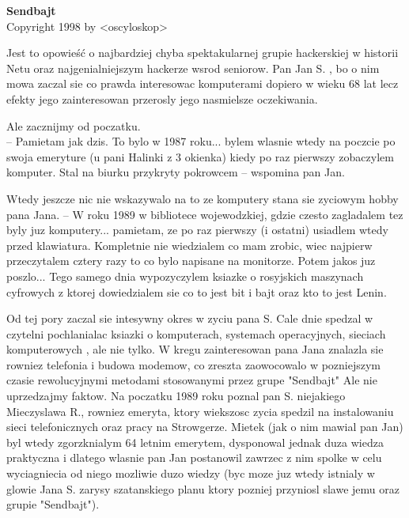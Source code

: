 \documentclass[a4paper,polish,titlepage,12pt]{article}
\begin{document}
\begin{titlepage}
\begin{center}
{\Huge\bf Sendbajt}\\
\vspace{2cm}
{\small Copyright 1998 by <oscyloskop>}
\end{center}
\end{titlepage}

Jest to opowieść o najbardziej chyba spektakularnej grupie hackerskiej w historii Netu oraz najgenialniejszym hackerze wsrod seniorow. Pan Jan S. , bo o nim mowa zaczal sie co prawda interesowac komputerami dopiero w wieku 68 lat lecz efekty jego zainteresowan przerosly jego nasmielsze oczekiwania.

Ale zacznijmy od poczatku.\\
-- Pamietam jak dzis. To bylo w 1987 roku... bylem wlasnie wtedy na poczcie po swoja emeryture (u pani Halinki z 3 okienka) kiedy po raz pierwszy zobaczylem komputer. Stal na biurku przykryty pokrowcem -- wspomina pan Jan.

Wtedy jeszcze nic nie wskazywalo na to ze komputery stana sie zyciowym hobby pana Jana.
-- W roku 1989 w bibliotece wojewodzkiej, gdzie czesto zagladalem tez byly juz komputery... pamietam, ze po raz pierwszy (i ostatni) usiadlem wtedy przed klawiatura. Kompletnie nie wiedzialem co mam zrobic, wiec najpierw przeczytalem cztery razy to co bylo napisane na monitorze. Potem jakos juz poszlo... Tego samego dnia wypozyczylem ksiazke o rosyjskich maszynach cyfrowych z ktorej dowiedzialem sie co to jest bit i bajt oraz kto to jest Lenin.

Od tej pory zaczal sie intesywny okres w zyciu pana S. Cale dnie spedzal w czytelni pochlanialac ksiazki o komputerach, systemach operacyjnych, sieciach komputerowych , ale nie tylko. W kregu zainteresowan pana Jana znalazla sie rowniez telefonia i budowa modemow, co zreszta zaowocowalo w pozniejszym czasie rewolucyjnymi metodami stosowanymi przez grupe "Sendbajt" Ale nie uprzedzajmy faktow. Na poczatku 1989 roku poznal pan S. niejakiego Mieczyslawa R., rowniez emeryta, ktory wiekszosc zycia spedzil na instalowaniu sieci telefonicznych oraz pracy na Strowgerze. Mietek (jak o nim mawial pan Jan) byl wtedy zgorzknialym 64 letnim emerytem, dysponowal jednak duza wiedza praktyczna i dlatego wlasnie pan Jan postanowil zawrzec z nim spolke w celu wyciagniecia od niego mozliwie duzo wiedzy (byc moze juz wtedy istnialy w glowie Jana S. zarysy szatanskiego planu ktory pozniej przyniosl slawe jemu oraz grupie "Sendbajt").
\end{document}
